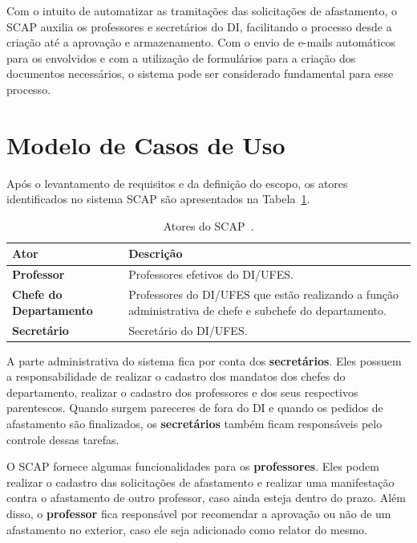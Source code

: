Com o intuito de automatizar as tramitações das solicitações de afastamento, o SCAP auxilia os professores e secretários do DI, facilitando o processo desde a criação até a aprovação e armazenamento. Com o envio de e-mails automáticos para os envolvidos e com a utilização de formulários para a criação dos documentos necessários, o sistema pode ser considerado fundamental para esse processo.      

\section{Modelo de Casos de Uso}
\label{sec-requisitos-modelo-casos-uso}

Após o levantamento de requisitos e da definição do escopo, os atores identificados no sistema SCAP são apresentados na Tabela~\ref{tabela-atores-scap}.  

\begin{table}[h]
	\centering	
	\vspace{0.5cm}
	\footnotesize
	\caption{Atores do SCAP~\cite{duarte-pg14}.}	
	\label{tabela-atores-scap}
	\begin{tabular}{|p{5.0cm}|p{9.0cm}|}  \hline 
 		
 		\rowcolor[rgb]{0.8,0.8,0.8} \textbf{Ator} & \textbf{Descrição} \\\hline 
		
		\textbf{Professor} & Professores efetivos do DI/UFES. \\\hline
		
		\textbf{Chefe do Departamento} & Professores do DI/UFES que estão realizando a função administrativa de chefe e subchefe do departamento. \\\hline
		
		\textbf{Secretário} & Secretário do DI/UFES. \\\hline
		
	\end{tabular}
\end{table}

A parte administrativa do sistema fica por conta dos \textbf{secretários}. Eles possuem a responsabilidade de realizar o cadastro dos mandatos dos chefes do departamento, realizar o cadastro dos professores e dos seus respectivos parentescos. Quando surgem pareceres de fora do DI e quando os pedidos de afastamento são finalizados, os \textbf{secretários} também ficam responsáveis pelo controle dessas tarefas.

O SCAP fornece algumas funcionalidades para os \textbf{professores}. Eles podem realizar o cadastro das solicitações de afastamento e realizar uma manifestação contra o afastamento de outro professor, caso ainda esteja dentro do prazo. Além disso, o \textbf{professor} fica responsável por recomendar a aprovação ou não de um afastamento no exterior, caso ele seja adicionado como relator do mesmo. 

